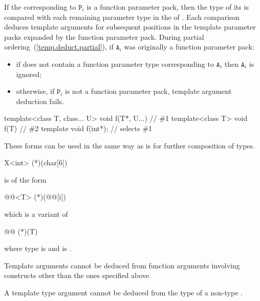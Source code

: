 If the 
corresponding to $\texttt{P}_i$ is a function parameter pack,
then the type of its  is compared with
each remaining parameter type in the 
of . Each comparison deduces template arguments for
subsequent positions in the template parameter packs expanded by the
function parameter pack.
During partial ordering~(\ref{temp.deduct.partial}), if $\texttt{A}_i$ was
originally a function parameter pack:

\begin{itemize}
\item if  does not contain a function parameter type corresponding to
$\texttt{A}_i$ then $\texttt{A}_i$ is ignored;

\item otherwise, if $\texttt{P}_i$ is not a function parameter pack, template
argument deduction fails.
\end{itemize}
\enterexample
\begin{codeblock}
template<class T, class... U> void f(T*, U...) { }    // \#1
template<class T>             void f(T) { }           // \#2
template void f(int*);      // selects \#1
\end{codeblock}
\exitexample

\pnum
These forms can be used in the same way as
is for further composition of types.
\enterexample

\begin{codeblock}
X<int> (*)(char[6])
\end{codeblock}

is of the form

\begin{codeblock}
@@<T> (*)(@@[i])
\end{codeblock}

which is a variant of

\begin{codeblock}
@@ (*)(T)
\end{codeblock}

where type is
and
is
.
\exitexample

\pnum
Template arguments cannot be deduced from function arguments involving
constructs other than the ones specified above.

\pnum
A template type argument cannot be deduced from the type of a non-type
.

